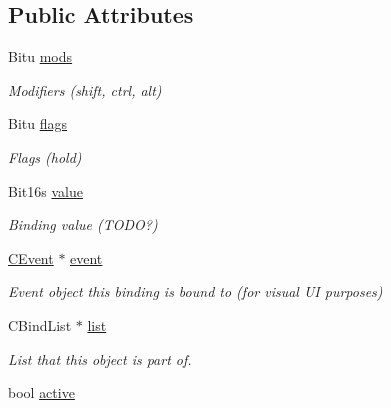 \subsection*{Public Attributes}
\begin{DoxyCompactItemize}
\item 
\hypertarget{classCBind_a91f9c2be14e33caf50f7be9157e67cc8}{Bitu \hyperlink{classCBind_a91f9c2be14e33caf50f7be9157e67cc8}{mods}}\label{classCBind_a91f9c2be14e33caf50f7be9157e67cc8}

\begin{DoxyCompactList}\small\item\em Modifiers (shift, ctrl, alt) \end{DoxyCompactList}\item 
\hypertarget{classCBind_a3d65630e149aa1df6f84cc78851f4d6c}{Bitu \hyperlink{classCBind_a3d65630e149aa1df6f84cc78851f4d6c}{flags}}\label{classCBind_a3d65630e149aa1df6f84cc78851f4d6c}

\begin{DoxyCompactList}\small\item\em Flags (hold) \end{DoxyCompactList}\item 
\hypertarget{classCBind_afff7b6160648ad63671611c53b1b6a7e}{Bit16s \hyperlink{classCBind_afff7b6160648ad63671611c53b1b6a7e}{value}}\label{classCBind_afff7b6160648ad63671611c53b1b6a7e}

\begin{DoxyCompactList}\small\item\em Binding value (T\-O\-D\-O?) \end{DoxyCompactList}\item 
\hypertarget{classCBind_a5a1677133911a7bc26357f56acc9f4dd}{\hyperlink{classCEvent}{C\-Event} $\ast$ \hyperlink{classCBind_a5a1677133911a7bc26357f56acc9f4dd}{event}}\label{classCBind_a5a1677133911a7bc26357f56acc9f4dd}

\begin{DoxyCompactList}\small\item\em Event object this binding is bound to (for visual U\-I purposes) \end{DoxyCompactList}\item 
\hypertarget{classCBind_a8adfc03bb65f5a8637d2c35c0b604822}{C\-Bind\-List $\ast$ \hyperlink{classCBind_a8adfc03bb65f5a8637d2c35c0b604822}{list}}\label{classCBind_a8adfc03bb65f5a8637d2c35c0b604822}

\begin{DoxyCompactList}\small\item\em List that this object is part of. \end{DoxyCompactList}\item 
\hypertarget{classCBind_ae469e84d9c8d985542ff5a65d6c86810}{bool \hyperlink{classCBind_ae469e84d9c8d985542ff5a65d6c86810}{active}}\label{classCBind_ae469e84d9c8d985542ff5a65d6c86810}


\end{DoxyCompactItemize}
